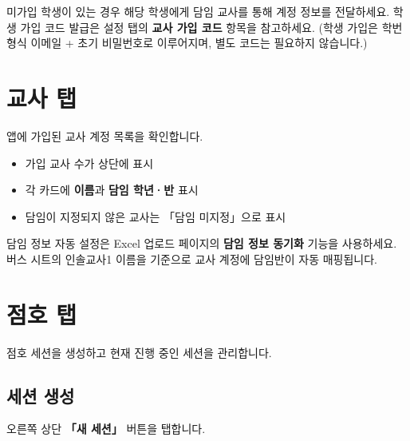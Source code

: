\documentclass[a4paper,11pt]{article}
\begin{document}
\begin{tcolorbox}[tipbox]
미가입 학생이 있는 경우 해당 학생에게 담임 교사를 통해 계정 정보를 전달하세요.
학생 가입 코드 발급은 설정 탭의 \textbf{교사 가입 코드} 항목을 참고하세요.
(학생 가입은 학번 형식 이메일 + 초기 비밀번호로 이루어지며, 별도 코드는 필요하지 않습니다.)
\end{tcolorbox}

\section{교사 탭}

앱에 가입된 교사 계정 목록을 확인합니다.

\begin{itemize}
  \item 가입 교사 수가 상단에 표시
  \item 각 카드에 \textbf{이름}과 \textbf{담임 학년·반} 표시
  \item 담임이 지정되지 않은 교사는 「담임 미지정」으로 표시
\end{itemize}

\begin{tcolorbox}[tipbox]
담임 정보 자동 설정은 Excel 업로드 페이지의 \textbf{담임 정보 동기화} 기능을 사용하세요.
버스 시트의 인솔교사1 이름을 기준으로 교사 계정에 담임반이 자동 매핑됩니다.
\end{tcolorbox}

\section{점호 탭}

점호 세션을 생성하고 현재 진행 중인 세션을 관리합니다.

\subsection{세션 생성}

오른쪽 상단 \textbf{「새 세션」} 버튼을 탭합니다.
\end{document}
